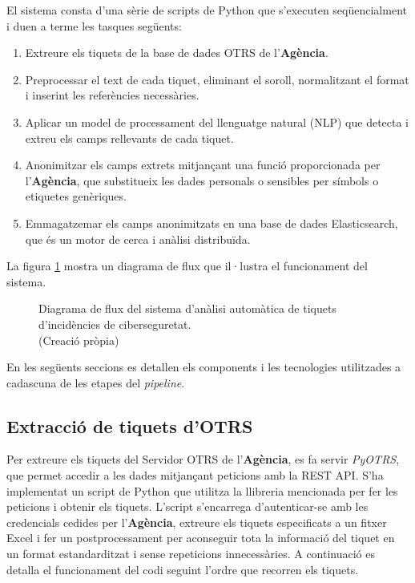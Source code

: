 El sistema consta d'una sèrie de scripts de Python que s'executen seqüencialment i duen a terme les tasques següents:

\begin{enumerate}
     \item Extreure els tiquets de la base de dades OTRS de l'\textbf{Agència}.
     \item Preprocessar el text de cada tiquet, eliminant el soroll, normalitzant el format i inserint les referències necessàries.
     \item Aplicar un model de processament del llenguatge natural (NLP) que detecta i extreu els camps rellevants de cada tiquet.
     \item Anonimitzar els camps extrets mitjançant una funció proporcionada per l'\textbf{Agència}, que substitueix les dades personals o sensibles per símbols o etiquetes genèriques.
     \item Emmagatzemar els camps anonimitzats en una base de dades Elasticsearch, que és un motor de cerca i anàlisi distribuïda.
\end{enumerate}

La figura \ref{fig:pipeline} mostra un diagrama de flux que il·lustra el funcionament del sistema.

\begin{figure}[H]
     \centering
     \vspace{1cm} %
     \setlength{\fboxsep}{5pt} %
     \setlength{\fboxrule}{0pt} %
     \caption{Diagrama de flux del sistema d'anàlisi automàtica de tiquets d'incidències de ciberseguretat. \\ (Creació pròpia)}
     \label{fig:pipeline}
\end{figure}

En les següents seccions es detallen els components i les tecnologies utilitzades a cadascuna de les etapes del \textit{pipeline}.
\subsection{Extracció de tiquets d'OTRS}
Per extreure els tiquets del Servidor OTRS de l'\textbf{Agència}, es fa servir \textit{PyOTRS}, que permet accedir a les dades mitjançant peticions amb la REST API. S'ha implementat un script de Python que utilitza la llibreria mencionada per fer les peticions i obtenir els tiquets. L'script s'encarrega d'autenticar-se amb les credencials cedides per l'\textbf{Agència}, extreure els tiquets especificats a un fitxer Excel i fer un postprocessament per aconseguir tota la informació del tiquet en un format estandarditzat i sense repeticions innecessàries. A continuació es detalla el funcionament del codi seguint l'ordre que recorren els tiquets.

